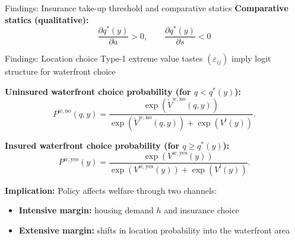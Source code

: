 \documentclass[xcolor=dvipsnames, aspectratio = 169]{beamer}
\begin{document}
{\begin{frame}{Findings: Insurance take-up threshold and comparative statics}
\medskip
\textbf{Comparative statics (qualitative):}
\[
\frac{\partial q^*(y)}{\partial a} > 0,
\qquad
\frac{\partial q^*(y)}{\partial s} < 0
\]

\end{frame}

\begin{frame}{Findings: Location choice}
Type-1 extreme value tastes $(\varepsilon_{ij})$ imply logit structure for waterfront choice

\medskip
\textbf{Uninsured waterfront choice probability (for $q<q^*(y)$):}
\[
P^{w,\text{no}}(q,y)=
\frac{\exp\left(\tilde V^{w,\text{no}}(q,y)\right)}
{\exp\left(\tilde V^{w,\text{no}}(q,y)\right)+\exp\left(V^l(y)\right)}.
\]

\textbf{Insured waterfront choice probability (for $q\ge q^*(y)$):}
\[
P^{w,\text{yes}}(y)=
\frac{\exp\left(V^{w,\text{yes}}(y)\right)}
{\exp\left(V^{w,\text{yes}}(y)\right)+\exp\left(V^l(y)\right)}.
\]

\medskip
\textbf{Implication:} Policy affects welfare through two channels:
\begin{itemize}
  \item \textbf{Intensive margin:} housing demand $h$ and insurance choice
  \item \textbf{Extensive margin:} shifts in location probability into the waterfront area
\end{itemize}
\end{frame}

}
\end{document}
